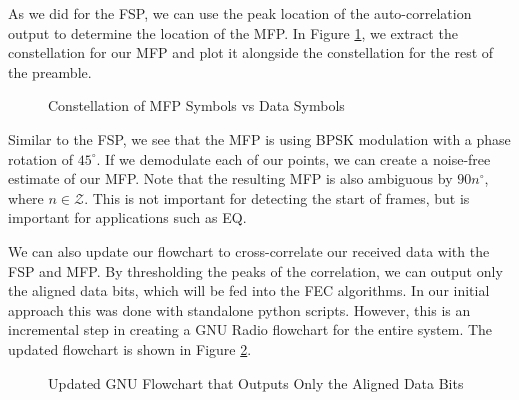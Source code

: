 \documentclass[conference,onecolumn]{IEEEtran}
\begin{document}
\noindent As we did for the FSP, we can use the peak location of the auto-correlation output to determine the location of the MFP. In Figure \ref{fig::mfp_constellation}, we extract the constellation for our MFP and plot it alongside the constellation for the rest of the preamble.

\begin{figure}[H]
	\centerline{}
	\caption{Constellation of MFP Symbols vs Data Symbols}
	\label{fig::mfp_constellation}
\end{figure}

\noindent Similar to the FSP, we see that the MFP is using BPSK modulation with a phase rotation of $45^{\circ}$. If we demodulate each of our points, we can create a noise-free estimate of our MFP. Note that the resulting MFP is also ambiguous by $90n^{\circ}$, where $n \in \mathcal{Z}$. This is not important for detecting the start of frames, but is important for applications such as EQ.

We can also update our flowchart to cross-correlate our received data with the FSP and MFP. By thresholding the peaks of the correlation, we can output only the aligned data bits, which will be fed into the FEC algorithms. In our initial approach this was done with standalone python scripts. However, this is an incremental step in creating a GNU Radio flowchart for the entire system. The updated flowchart is shown in Figure \ref{fig::frame_align}.

\begin{figure}[H]
	\centerline{}
	\caption{Updated GNU Flowchart that Outputs Only the Aligned Data Bits}
	\label{fig::frame_align}
\end{figure}
\end{document}
